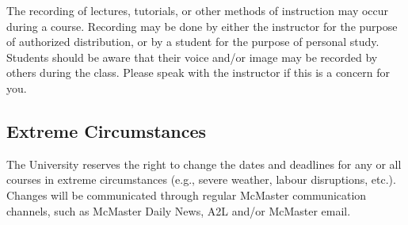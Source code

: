\documentclass[12pt]{article}
\begin{document}
The recording of lectures, tutorials, or other methods of instruction may occur
during a course. Recording may be done by either the instructor for the purpose
of authorized distribution, or by a student for the purpose of personal
study. Students should be aware that their voice and/or image may be recorded by
others during the class. Please speak with the instructor if this is a concern
for you.

\subsection*{Extreme Circumstances} 

The University reserves the right to change the dates and deadlines for any or
all courses in extreme circumstances (e.g., severe weather, labour disruptions,
etc.). Changes will be communicated through regular McMaster communication
channels, such as McMaster Daily News, A2L and/or McMaster email.
\end{document}
